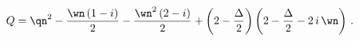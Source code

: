 \begin{equation}
 Q = \qn^2 - {\wn\, (1-i)\over 2} - {\wn^2\, (2-i)\over 2}
 + \left( 2 - {\Delta\over 2} \right) 
\left(  2 - {\Delta\over 2} - 2\,  i\,  \wn \right) \,.
\end{equation}

